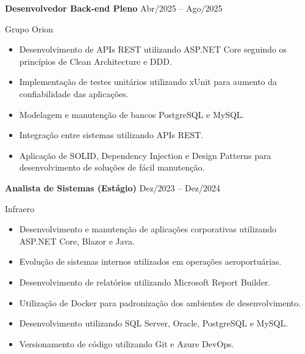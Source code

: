 \documentclass[11pt,a4paper]{article}
\begin{document}
\textbf{Desenvolvedor Back-end Pleno}
\hfill Abr/2025 -- Ago/2025

Grupo Orion

\begin{itemize}[leftmargin=*,noitemsep,topsep=2pt]

\item Desenvolvimento de APIs REST utilizando ASP.NET Core seguindo os princípios de Clean Architecture e DDD.

\item Implementação de testes unitários utilizando xUnit para aumento da confiabilidade das aplicações.

\item Modelagem e manutenção de bancos PostgreSQL e MySQL.

\item Integração entre sistemas utilizando APIs REST.

\item Aplicação de SOLID, Dependency Injection e Design Patterns para desenvolvimento de soluções de fácil manutenção.

\end{itemize}


\textbf{Analista de Sistemas (Estágio)}
\hfill Dez/2023 -- Dez/2024

Infraero

\begin{itemize}[leftmargin=*,noitemsep,topsep=2pt]

\item Desenvolvimento e manutenção de aplicações corporativas utilizando ASP.NET Core, Blazor e Java.

\item Evolução de sistemas internos utilizados em operações aeroportuárias.

\item Desenvolvimento de relatórios utilizando Microsoft Report Builder.

\item Utilização de Docker para padronização dos ambientes de desenvolvimento.

\item Desenvolvimento utilizando SQL Server, Oracle, PostgreSQL e MySQL.

\item Versionamento de código utilizando Git e Azure DevOps.

\end{itemize}


\end{document}
